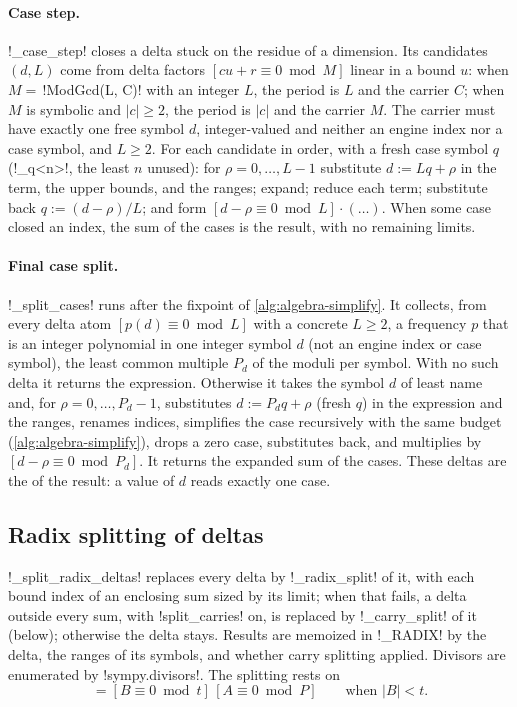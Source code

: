 \paragraph{Case step.} \py!_case_step! closes a delta stuck on the residue of a dimension. Its candidates $(d,L)$ come from delta factors $[cu+r\equiv 0\bmod M]$ linear in a bound $u$: when $M=$\,\py!ModGcd(L, C)! with an integer $L$, the period is $L$ and the carrier $C$; when $M$ is symbolic and $|c|\ge 2$, the period is $|c|$ and the carrier $M$. The carrier must have exactly one free symbol $d$, integer-valued and neither an engine index nor a case symbol, and $L\ge 2$. For each candidate in order, with a fresh case symbol $q$ (\code!_q<n>!, the least $n$ unused): for $\rho=0,\ldots,L-1$ substitute $d:=Lq+\rho$ in the term, the upper bounds, and the ranges; expand; reduce each term; substitute back $q:=(d-\rho)/L$; and form $[d-\rho\equiv0\bmod L]\cdot(\ldots)$. When some case closed an index, the sum of the cases is the result, with no remaining limits.

\paragraph{Final case split.} \py!_split_cases! runs after the fixpoint of \cref{alg:algebra-simplify}. It collects, from every delta atom $[p(d)\equiv0\bmod L]$ with a concrete $L\ge 2$, a frequency $p$ that is an integer polynomial in one integer symbol $d$ (not an engine index or case symbol), the least common multiple $P_d$ of the moduli per symbol. With no such delta it returns the expression. Otherwise it takes the symbol $d$ of least name and, for $\rho=0,\ldots,P_d-1$, substitutes $d:=P_dq+\rho$ (fresh $q$) in the expression and the ranges, renames indices, simplifies the case recursively with the same budget (\cref{alg:algebra-simplify}), drops a zero case, substitutes back, and multiplies by $[d-\rho\equiv0\bmod P_d]$. It returns the expanded sum of the cases. These deltas are the  of the result: a value of $d$ reads exactly one case.

\subsection{Radix splitting of deltas}\label{sec:algebra-simplify-radix}

\py!_split_radix_deltas! replaces every delta by \py!_radix_split! of it, with each bound index of an enclosing sum sized by its limit; when that fails, a delta outside every sum, with \code!split_carries! on, is replaced by \py!_carry_split! of it (below); otherwise the delta stays. Results are memoized in \py!_RADIX! by the delta, the ranges of its symbols, and whether carry splitting applied. Divisors are enumerated by \py!sympy.divisors!. The splitting rests on
\begin{equation}
[tA+B\equiv 0\bmod Pt]=[B\equiv0\bmod t]\,[A\equiv 0\bmod P]\qquad\text{when }|B|<t.
\end{equation}

